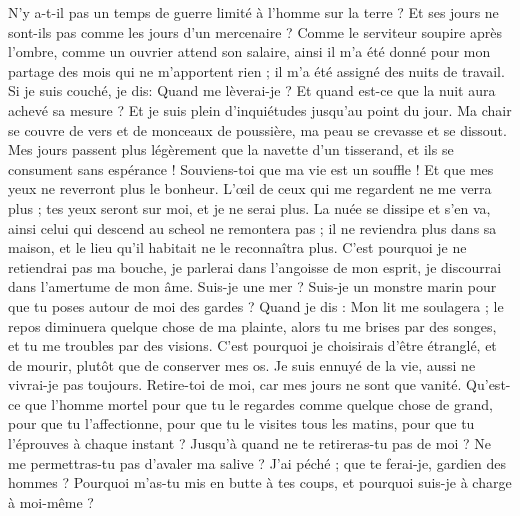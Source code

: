 \begin{multicols}{2}
\VerseOne{}N'y a-t-il pas un temps de guerre limité à l'homme sur la terre ? Et ses jours ne sont-ils pas comme les jours d'un mercenaire ?
Comme le serviteur soupire après l'ombre, comme un ouvrier attend son salaire, 
ainsi il m'a été donné pour mon partage des mois qui ne m'apportent rien ; il m'a été assigné des nuits de travail.
Si je suis couché, je dis: Quand me lèverai-je ? Et quand est-ce que la nuit aura achevé sa mesure ? Et je suis plein d'inquiétudes jusqu'au point du jour.
Ma chair se couvre de vers et de monceaux de poussière, ma peau se crevasse et se dissout.
Mes jours passent plus légèrement que la navette d'un tisserand, et ils se consument sans espérance !
Souviens-toi que ma vie est un souffle ! Et que mes yeux ne reverront plus le bonheur.
L'œil de ceux qui me regardent ne me verra plus ; tes yeux seront sur moi, et je ne serai plus.
La nuée se dissipe et s'en va, ainsi celui qui descend au scheol ne remontera pas ;
il ne reviendra plus dans sa maison, et le lieu qu'il habitait ne le reconnaîtra plus.
C'est pourquoi je ne retiendrai pas ma bouche, je parlerai dans l'angoisse de mon esprit, je discourrai dans l'amertume de mon âme.
Suis-je une mer ? Suis-je un monstre marin pour que tu poses autour de moi des gardes ?
Quand je dis : Mon lit me soulagera ; le repos diminuera quelque chose de ma plainte,
alors tu me brises par des songes, et tu me troubles par des visions.
C'est pourquoi je choisirais d'être étranglé, et de mourir, plutôt que de conserver mes os.
Je suis ennuyé de la vie, aussi ne vivrai-je pas toujours. Retire-toi de moi, car mes jours ne sont que vanité.
Qu'est-ce que l'homme mortel pour que tu le regardes comme quelque chose de grand, pour que tu l'affectionne,
pour que tu le visites tous les matins, pour que tu l'éprouves à chaque instant ?
Jusqu'à quand ne te retireras-tu pas de moi ? Ne me permettras-tu pas d'avaler ma salive ?
J'ai péché ; que te ferai-je, gardien des hommes ? Pourquoi m'as-tu mis en butte à tes coups, et pourquoi suis-je à charge à moi-même ?

\end{multicols}

